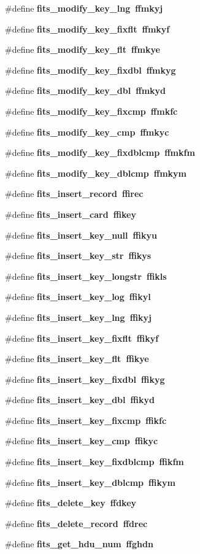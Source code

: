\begin{CompactItemize}
\#define \bf{fits\_\-modify\_\-key\_\-lng}~ffmkyj
\item 
\#define \bf{fits\_\-modify\_\-key\_\-fixflt}~ffmkyf
\item 
\#define \bf{fits\_\-modify\_\-key\_\-flt}~ffmkye
\item 
\#define \bf{fits\_\-modify\_\-key\_\-fixdbl}~ffmkyg
\item 
\#define \bf{fits\_\-modify\_\-key\_\-dbl}~ffmkyd
\item 
\#define \bf{fits\_\-modify\_\-key\_\-fixcmp}~ffmkfc
\item 
\#define \bf{fits\_\-modify\_\-key\_\-cmp}~ffmkyc
\item 
\#define \bf{fits\_\-modify\_\-key\_\-fixdblcmp}~ffmkfm
\item 
\#define \bf{fits\_\-modify\_\-key\_\-dblcmp}~ffmkym
\item 
\#define \bf{fits\_\-insert\_\-record}~ffirec
\item 
\#define \bf{fits\_\-insert\_\-card}~ffikey
\item 
\#define \bf{fits\_\-insert\_\-key\_\-null}~ffikyu
\item 
\#define \bf{fits\_\-insert\_\-key\_\-str}~ffikys
\item 
\#define \bf{fits\_\-insert\_\-key\_\-longstr}~ffikls
\item 
\#define \bf{fits\_\-insert\_\-key\_\-log}~ffikyl
\item 
\#define \bf{fits\_\-insert\_\-key\_\-lng}~ffikyj
\item 
\#define \bf{fits\_\-insert\_\-key\_\-fixflt}~ffikyf
\item 
\#define \bf{fits\_\-insert\_\-key\_\-flt}~ffikye
\item 
\#define \bf{fits\_\-insert\_\-key\_\-fixdbl}~ffikyg
\item 
\#define \bf{fits\_\-insert\_\-key\_\-dbl}~ffikyd
\item 
\#define \bf{fits\_\-insert\_\-key\_\-fixcmp}~ffikfc
\item 
\#define \bf{fits\_\-insert\_\-key\_\-cmp}~ffikyc
\item 
\#define \bf{fits\_\-insert\_\-key\_\-fixdblcmp}~ffikfm
\item 
\#define \bf{fits\_\-insert\_\-key\_\-dblcmp}~ffikym
\item 
\#define \bf{fits\_\-delete\_\-key}~ffdkey
\item 
\#define \bf{fits\_\-delete\_\-record}~ffdrec
\item 
\#define \bf{fits\_\-get\_\-hdu\_\-num}~ffghdn
\item 

\end{CompactItemize}

